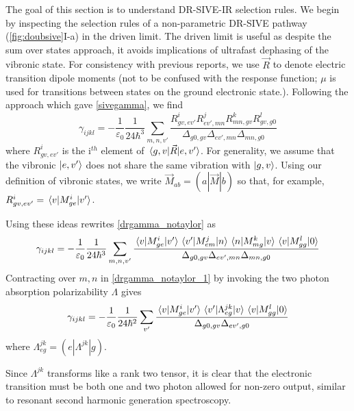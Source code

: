\documentclass[aip, jcp, draft, onecolumn]{revtex4-2}
\begin{document}
The goal of this section is to understand DR-SIVE-IR selection rules.
We begin by inspecting the selection rules of a non-parametric DR-SIVE pathway (\autoref{fig:doubsive}I-a) in the driven limit. 
The driven limit is useful as despite the sum over states approach, it avoids implications of ultrafast dephasing of the vibronic state.\cite{Cho2001} 
For consistency with previous reports, we use $\vec{R}$ to denote electric transition dipole moments (not to be confused with the response function; $\mu$ is used for transitions between states on the ground electronic state.). \cite{Ziegler1974}
Following the approach which gave \autoref{sivegamma}, we find
\begin{equation}\label{drgamma_notaylor}
	\gamma_{ijkl} = -\frac{1}{\varepsilon_0} \frac{1}{24 \hbar^3} \sum_{m,n,v'} \frac{
		R^{i}_{gv,ev'} 
		R^{j}_{ev',mn} 
		R^{k}_{mn,gv} 
		R^{l}_{gv,g0} 
	}{\Delta_{g0,gv}
		\Delta_{ev', mn}
		\Delta_{mn, g0}
	}
\end{equation}
where $R^{i}_{gv,ev'}$ is the i$^{th}$ element of $\mel{g,v}{\vec{R}}{e,v'}$.
For generality, we assume that the vibronic  $\ket{e,v'}$ does not share the same vibration with $\ket{g,v}$. \cite{Ziegler1988}
Using our definition of vibronic states, we write $\vec{M}_{ab} = (a|\vec{M}|b)$ so that, for example,
$R^{i}_{gv,ev'} = \mel{v}{M^i_{ge}}{v'}$.\cite{Albrecht1960}
\begin{widetext}
Using these ideas rewrites \autoref{drgamma_notaylor} as
\begin{equation}\label{drgamma_notaylor_1}
	\gamma_{ijkl} = -\frac{1}{\varepsilon_0} \frac{1}{24 \hbar^3} \sum_{m,n,v'} \frac{
		\mel{v}{M^{i}_{ge}}{v'} 
		\mel{v'}{M^{j}_{em}}{n}
		\mel{n}{M^{k}_{mg} }{v}
		\mel{v}{M^{l}_{gg}}{0}
	}{\Delta_{g0,gv}
		\Delta_{ev', mn}
		\Delta_{mn, g0}	}
\end{equation}
Contracting over $m,n$ in \autoref{drgamma_notaylor_1} by invoking the two photon absorption polarizability $\Lambda$ gives \cite{McClain1977, Simpson2004, Olson2018}
\begin{equation}\label{drgamma_alpha_0}
	\gamma_{ijkl} = -\frac{1}{\varepsilon_0} \frac{1}{24 \hbar^2} \sum_{v'} \frac{
		\mel{v}{M^{i}_{ge}}{v'} 
		\mel{v'}{\Lambda^{jk}_{eg}}{v}
		\mel{v}{M^{l}_{gg}}{0}
	}{\Delta_{g0,gv}
		\Delta_{ev', g0}
	}
\end{equation}
where ${\Lambda^{jk}_{eg}} = (e|\Lambda^{jk}|g)$. 
\end{widetext}
Since $\Lambda^{jk}$ transforms like a rank two tensor, it is clear that the electronic transition must be both one and two photon allowed for non-zero output, similar to resonant second harmonic generation spectroscopy. \cite{Heinz1982, Nguyen1986, Simpson2004}
\end{document}
